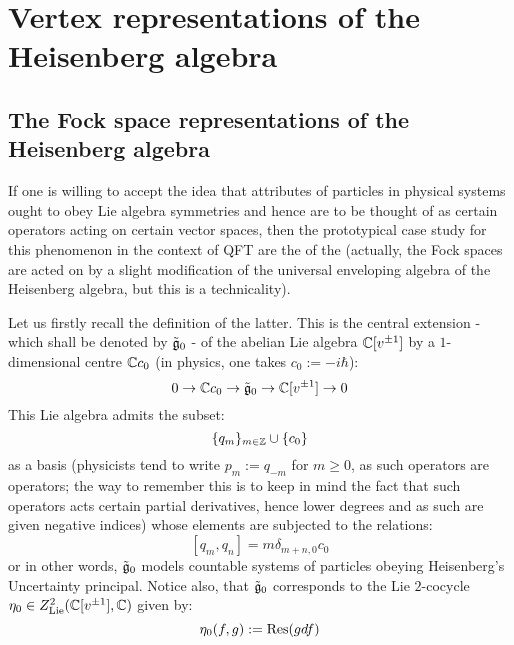     \section{Vertex representations of the Heisenberg algebra}
        \subsection{The Fock space representations of the Heisenberg algebra}
            If one is willing to accept the idea that attributes of particles in physical systems ought to obey Lie algebra symmetries and hence are to be thought of as certain operators acting on certain vector spaces, then the prototypical case study for this phenomenon in the context of QFT are the  of the  (actually, the Fock spaces are acted on by a slight modification of the universal enveloping algebra of the Heisenberg algebra, but this is a technicality).

            Let us firstly recall the definition of the latter. This is the central extension - which shall be denoted by $\tilde{\mathfrak{g}}_0$ - of the abelian Lie algebra $\mathbb{C}[v^{\pm 1}]$ by a $1$-dimensional centre $\mathbb{C} c_0$ (in physics, one takes $c_0 := -i\hbar$):
                $$0 \to \mathbb{C} c_0 \to \tilde{\mathfrak{g}}_0 \to \mathbb{C}[v^{\pm 1}] \to 0$$
            This Lie algebra admits the subset:
                $$\{q_m\}_{m \in \mathbb{Z}} \cup \{c_0\}$$
            as a basis (physicists tend to write $p_m := q_{-m}$ for $m \geq 0$, as such operators are  operators; the way to remember this is to keep in mind the fact that such operators acts certain partial derivatives, hence lower degrees and as such are given negative indices) whose elements are subjected to the relations:
                $$[q_m, q_n] = m \delta_{m + n, 0} c_0$$
            or in other words, $\tilde{\mathfrak{g}}_0$ models countable systems of particles obeying Heisenberg's Uncertainty principal. Notice also, that $\tilde{\mathfrak{g}}_0$ corresponds to the Lie $2$-cocycle $\eta_0 \in Z^2_{\mathrm{Lie}}(\mathbb{C}[v^{\pm 1}], \mathbb{C})$ given by:
                $$\eta_0(f, g) := \mathrm{Res}(gdf)$$

